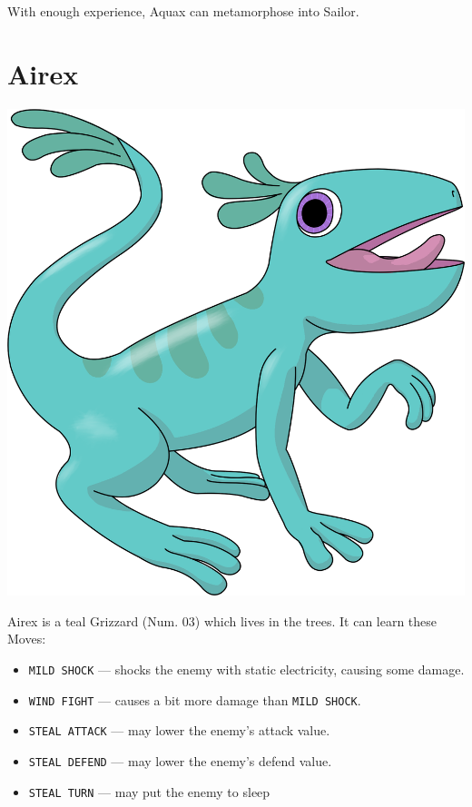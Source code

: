 \documentclass[10pt,twocolumn,openany,article]{memoir}
\begin{document}
With enough experience, Aquax can metamorphose into Sailor.

\ifdefined\DEMO\else

\section{Airex}

\begin{center}
  \includegraphics[width=\columnwidth]{../Manual/Airex.png}
\end{center}

Airex is  a teal  Grizzard (Num. 03)  which lives in  the trees.  It can
learn these Moves:

\begin{itemize}
\item \texttt{MILD SHOCK} --- shocks  the enemy with static electricity,
  causing some damage.
\item \texttt{WIND FIGHT} --- causes a bit more damage than \texttt{MILD SHOCK}.
\item \texttt{STEAL ATTACK} --- may lower the enemy's attack value.
\item \texttt{STEAL DEFEND} --- may lower the enemy's defend value.
\item \texttt{STEAL TURN} --- may put the enemy to sleep
\end{itemize}
\end{document}
